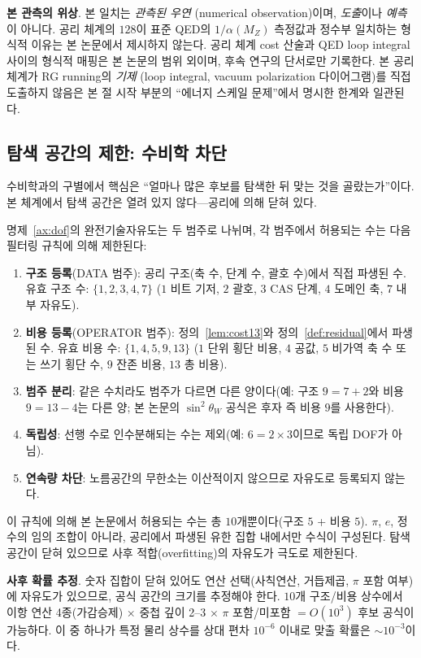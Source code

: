 \documentclass[entropy,article,submit,pdftex,oneauthor]{Definitions/mdpi}
\begin{document}
\textbf{본 관측의 위상}. 본 일치는 \emph{관측된 우연} (numerical observation)이며, \emph{도출}이나 \emph{예측}이 아니다. 공리 체계의 $128$이 표준 QED의 $1/\alpha(M_Z)$ 측정값과 정수부 일치하는 형식적 이유는 본 논문에서 제시하지 않는다. 공리 체계 cost 산술과 QED loop integral 사이의 형식적 매핑은 본 논문의 범위 외이며, 후속 연구의 단서로만 기록한다. 본 공리 체계가 RG running의 \emph{기제} (loop integral, vacuum polarization 다이어그램)를 직접 도출하지 않음은 본 절 시작 부분의 ``에너지 스케일 문제''에서 명시한 한계와 일관된다.

\subsection{탐색 공간의 제한: 수비학 차단}

수비학과의 구별에서 핵심은 ``얼마나 많은 후보를 탐색한 뒤 맞는 것을 골랐는가''이다. 본 체계에서 탐색 공간은 열려 있지 않다---공리에 의해 닫혀 있다.

명제~\ref{ax:dof}의 완전기술자유도는 두 범주로 나뉘며, 각 범주에서 허용되는 수는 다음 필터링 규칙에 의해 제한된다:
\begin{enumerate}
\item \textbf{구조 등록}(DATA 범주): 공리 구조(축 수, 단계 수, 괄호 수)에서 직접 파생된 수. 유효 구조 수: $\{1, 2, 3, 4, 7\}$ ($1$ 비트 기저, $2$ 괄호, $3$ CAS 단계, $4$ 도메인 축, $7$ 내부 자유도).
\item \textbf{비용 등록}(OPERATOR 범주): 정의~\ref{lem:cost13}와 정의~\ref{def:residual}에서 파생된 수. 유효 비용 수: $\{1, 4, 5, 9, 13\}$ ($1$ 단위 횡단 비용, $4$ 공값, $5$ 비가역 축 수 또는 쓰기 횡단 수, $9$ 잔존 비용, $13$ 총 비용).
\item \textbf{범주 분리}: 같은 수치라도 범주가 다르면 다른 양이다(예: 구조 $9 = 7+2$와 비용 $9 = 13-4$는 다른 양; 본 논문의 $\sin^2\theta_W$ 공식은 후자 즉 비용 $9$를 사용한다).
\item \textbf{독립성}: 선행 수로 인수분해되는 수는 제외(예: $6 = 2 \times 3$이므로 독립 DOF가 아님).
\item \textbf{연속량 차단}: 노름공간의 무한소는 이산적이지 않으므로 자유도로 등록되지 않는다.
\end{enumerate}

이 규칙에 의해 본 논문에서 허용되는 수는 총 $10$개뿐이다(구조 $5$ + 비용 $5$). $\pi$, $e$, 정수의 임의 조합이 아니라, 공리에서 파생된 유한 집합 내에서만 수식이 구성된다. 탐색 공간이 닫혀 있으므로 사후 적합(overfitting)의 자유도가 극도로 제한된다.

\textbf{사후 확률 추정}. 숫자 집합이 닫혀 있어도 연산 선택(사칙연산, 거듭제곱, $\pi$ 포함 여부)에 자유도가 있으므로, 공식 공간의 크기를 추정해야 한다. $10$개 구조/비용 상수에서 이항 연산 4종(가감승제) $\times$ 중첩 깊이 2--3 $\times$ $\pi$ 포함/미포함 $= O(10^3)$ 후보 공식이 가능하다. 이 중 하나가 특정 물리 상수를 상대 편차 $10^{-6}$ 이내로 맞출 확률은 $\sim 10^{-3}$이다.
\end{document}
